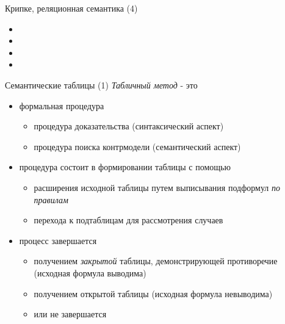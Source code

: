\documentclass{beamer}
\begin{document}
\begin{frame}{Крипке, реляционная семантика (4)}
\begin{itemize}
  \item 
  \item 
  \item 
  \item 
\end{itemize}
\end{frame}

\begin{frame}{Семантические таблицы (1)}
\textit{Табличный метод} - это \\
\bigskip
\begin{itemize}
  \item формальная процедура
    \begin{itemize}
      \item процедура доказательства (синтаксический аспект)
      \item процедура поиска контрмодели (семантический аспект)
    \end{itemize}
  \item процедура состоит в формировании таблицы с помощью 
    \begin{itemize}
      \item расширения исходной таблицы путем выписывания подформул \textit{по правилам}
      \item перехода к подтаблицам для рассмотрения случаев
    \end{itemize}  
  \item процесс завершается 
    \begin{itemize}
      \item получением \textit{закрытой} таблицы, демонстрирующей противоречие (исходная формула выводима)
      \item получением открытой таблицы (исходная формула невыводима)
      \item или не завершается
    \end{itemize}
\end{itemize}
\end{frame}
\end{document}
